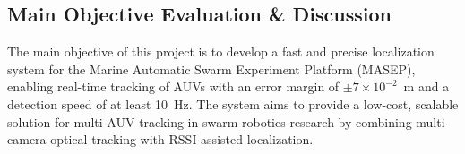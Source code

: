 \documentclass[11pt]{article}
\begin{document}
        

    \subsection{Main Objective Evaluation \& Discussion}
        The main objective of this project is to develop a fast and precise localization system for the Marine Automatic Swarm Experiment Platform (MASEP), enabling real-time tracking of AUVs with an error margin of $\pm 7\times 10^{-2}$~m and a detection speed of at least 10~Hz. The system aims to provide a low-cost, scalable solution for multi-AUV tracking in swarm robotics research by combining multi-camera optical tracking with RSSI-assisted localization.
\end{document}
